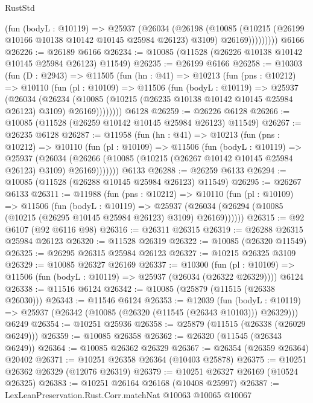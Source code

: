 \begin{lexlean}{RustStd}
\begin{coremodule}
              (fun (bodyL : @10119) =>
              @25937
                (@26034
                  (@26198
                    (@10085
                      (@10215 (@26199 @10166 @10138 @10142 @10145 @25984 @26123) @3109)
                      @26169)))))))))
    @6166
@26226 := @26189 @6166
@26234 := @10085 (@11528 (@26226 @10138 @10142 @10145 @25984 @26123) @11549)
@26235 := @26199 @6166
@26258 := @10303
    (fun (D : @2943) =>
    @11505
      (fun (hn : @41) =>
      @10213
        (fun (pns : @10212) =>
        @10110
          (fun (pl : @10109) =>
          @11506
            (fun (bodyL : @10119) =>
            @25937
              (@26034
                (@26234
                  (@10085 (@10215 (@26235 @10138 @10142 @10145 @25984 @26123) @3109) @26169))))))))
    @6128
@26259 := @26226 @6128
@26266 := @10085 (@11528 (@26259 @10142 @10145 @25984 @26123) @11549)
@26267 := @26235 @6128
@26287 := @11958
    (fun (hn : @41) =>
    @10213
      (fun (pns : @10212) =>
      @10110
        (fun (pl : @10109) =>
        @11506
          (fun (bodyL : @10119) =>
          @25937
            (@26034
              (@26266 (@10085 (@10215 (@26267 @10142 @10145 @25984 @26123) @3109) @26169)))))))
    @6133
@26288 := @26259 @6133
@26294 := @10085 (@11528 (@26288 @10145 @25984 @26123) @11549)
@26295 := @26267 @6133
@26311 := @11988
    (fun (pns : @10212) =>
    @10110
      (fun (pl : @10109) =>
      @11506
        (fun (bodyL : @10119) =>
        @25937 (@26034 (@26294 (@10085 (@10215 (@26295 @10145 @25984 @26123) @3109) @26169))))))
@26315 := @92 @6107 (@92 @6116 @98)
@26316 := @26311 @26315
@26319 := @26288 @26315 @25984 @26123
@26320 := @11528 @26319
@26322 := @10085 (@26320 @11549)
@26325 := @26295 @26315 @25984 @26123
@26327 := @10215 @26325 @3109
@26329 := @10085 @26327 @26169
@26337 := @10300
    (fun (pl : @10109) => @11506 (fun (bodyL : @10119) => @25937 (@26034 (@26322 @26329))))
    @6124
@26338 := @11516 @6124
@26342 := @10085 (@25879 (@11515 (@26338 @26030)))
@26343 := @11546 @6124
@26353 := @12039
    (fun (bodyL : @10119) => @25937 (@26342 (@10085 (@26320 (@11545 (@26343 @10103))) @26329)))
    @6249
@26354 := @10251 @25936
@26358 := @25879 (@11515 (@26338 (@26029 @6249)))
@26359 := @10085 @26358
@26362 := @26320 (@11545 (@26343 @6249))
@26364 := @10085 @26362 @26329
@26367 := @26354 (@26359 @26364) @20402
@26371 := @10251 @26358 @26364 (@10403 @25878)
@26375 := @10251 @26362 @26329 (@12076 @26319)
@26379 := @10251 @26327 @26169 (@10524 @26325)
@26383 := @10251 @26164 @26168 (@10408 @25997)
@26387 := LexLeanPreservation.Rust.Corr.matchNat @10063 @10065 @10067

\end{coremodule}
\end{lexlean}
